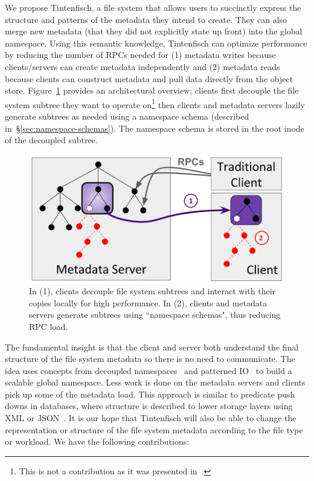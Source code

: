 We propose Tintenfisch, a file system that allows users to succinctly express
the structure and patterns of the metadata they intend to create.  They can
also merge new metadata (that they did not explicitly state up front) into the
global namespace.  Using this semantic knowledge, Tintenfisch can optimize
performance by reducing the number of RPCs needed for (1) metadata writes
because clients/servers can create metadata independently and (2) metadata
reads because clients can construct metadata and pull data directly from the
object store. Figure~\ref{fig:intro} provides an architectural overview;
clients first decouple the file system subtree they want to operate
on\footnote{This is not a contribution as it was presented
in~\cite{sevilla:ipdps18-cudele}.} then clients and metadata servers lazily
generate subtrees as needed using a namespace schema (described
in~\S\ref{sec:namespace-schemas}). The namespace schema is stored in the root
inode of the decoupled subtree.

\begin{figure}[t]
  \centering
  \includegraphics[width=0.9\linewidth]{figures/intro.png}
  \caption{In (1), clients decouple file system subtrees and interact
with their copies locally for high performance. In (2), clients and
metadata servers generate subtrees using ``namespace schemas", thus reducing
RPC load.  \label{fig:intro}}
\end{figure}

The fundamental insight is that the client and server both understand the final
structure of the file system metadata so there is no need to communicate.  The
idea uses concepts from decoupled namespaces~\cite{zheng:pdsw2014-batchfs,
zheng:pdsw2015-deltafs} and patterned IO~\cite{he:hpdc13-plfs-patterns} to
build a scalable global namespace. Less work is done on the metadata servers
and clients pick up some of the metadata load.  This approach is similar to
predicate push downs in databases, where structure is described to lower
storage layers using XML or JSON~\cite{shel:pc17-pushdown}. It is our hope that
Tintenfisch will also be able to change the representation or structure of the
file system metadata according to the file type or workload.  We have the
following contributions:

